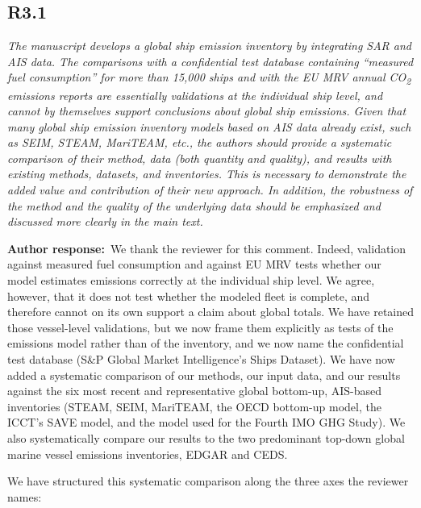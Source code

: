 \documentclass[11pt]{article}
\newcommand{\point}[1]{\subsection*{\normalfont\bfseries #1}}
\newcommand{\response}{\par\medskip\noindent%
  \textbf{\textcolor{respblue}{Author response:}}\ }
\begin{document}
\point{R3.1}

\begin{refquote}\itshape
The manuscript develops a global ship emission inventory by integrating SAR and AIS data. The comparisons with a confidential test database containing ``measured fuel consumption'' for more than 15,000 ships and with the EU MRV annual CO\textsubscript{2} emissions reports are essentially validations at the individual ship level, and cannot by themselves support conclusions about global ship emissions. Given that many global ship emission inventory models based on AIS data already exist, such as SEIM, STEAM, MariTEAM, etc., the authors should provide a systematic comparison of their method, data (both quantity and quality), and results with existing methods, datasets, and inventories. This is necessary to demonstrate the added value and contribution of their new approach. In addition, the robustness of the method and the quality of the underlying data should be emphasized and discussed more clearly in the main text.
\end{refquote}

\response We thank the reviewer for this comment. Indeed, validation against measured fuel consumption and against EU MRV tests whether our model estimates emissions correctly at the individual ship level. We agree, however, that it does not test whether the modeled fleet is complete, and therefore cannot on its own support a claim about global totals. We have retained those vessel-level validations, but we now frame them explicitly as tests of the emissions model rather than of the inventory, and we now name the confidential test database (S\&P Global Market Intelligence's Ships Dataset). We have now added a systematic comparison of our methods, our input data, and our results against the six most recent and representative global bottom-up, AIS-based inventories (STEAM, SEIM, MariTEAM, the OECD bottom-up model, the ICCT's SAVE model, and the model used for the Fourth IMO GHG Study). We also systematically compare our results to the two predominant top-down global marine vessel emissions inventories, EDGAR and CEDS.

We have structured this systematic comparison along the three axes the reviewer names:
\end{document}
